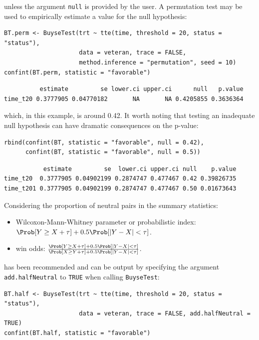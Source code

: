 \documentclass[12pt]{article}
\begin{document}
unless the argument \texttt{null} is provided by the user. A permutation test
may be used to empirically estimate a value for the null hypothesis:
\lstset{language=r,label= ,caption= ,captionpos=b,numbers=none}
\begin{lstlisting}
BT.perm <- BuyseTest(trt ~ tte(time, threshold = 20, status = "status"),
                     data = veteran, trace = FALSE,
                     method.inference = "permutation", seed = 10)
confint(BT.perm, statistic = "favorable")
\end{lstlisting}

\begin{verbatim}
          estimate         se lower.ci upper.ci      null   p.value
time_t20 0.3777905 0.04770182       NA       NA 0.4205855 0.3636364
\end{verbatim}


which, in this example, is around 0.42. It worth noting that testing
an inadequate null hypothesis can have dramatic consequences on the
p-value:
\lstset{language=r,label= ,caption= ,captionpos=b,numbers=none}
\begin{lstlisting}
rbind(confint(BT, statistic = "favorable", null = 0.42),
      confint(BT, statistic = "favorable", null = 0.5))
\end{lstlisting}

\begin{verbatim}
           estimate         se  lower.ci upper.ci null    p.value
time_t20  0.3777905 0.04902199 0.2874747 0.477467 0.42 0.39826735
time_t201 0.3777905 0.04902199 0.2874747 0.477467 0.50 0.01673643
\end{verbatim}


\clearpage

Considering the proportion of neutral pairs in the summary statistics:
\hfill
\begin{itemize}
\item Wilcoxon-Mann-Whitney parameter or probabilistic index: \(\Prob[Y\geq X + \tau] + 0.5 \Prob[|Y- X| < \tau]\).
\item win odds: \(\frac{\Prob[Y\geq X + \tau] + 0.5 \Prob[|Y- X| < \tau]}{\Prob[X\geq Y + \tau] + 0.5 \Prob[|Y- X| < \tau]}\).
\end{itemize}
has been recommended \citep{ajufo2023fallacies} and can be output by
specifying the argument \texttt{add.halfNeutral} to \texttt{TRUE} when calling
\texttt{BuyseTest}:
\lstset{language=r,label= ,caption= ,captionpos=b,numbers=none}
\begin{lstlisting}
BT.half <- BuyseTest(trt ~ tte(time, threshold = 20, status = "status"),
                     data = veteran, trace = FALSE, add.halfNeutral = TRUE)
confint(BT.half, statistic = "favorable")
\end{lstlisting}
\end{document}
